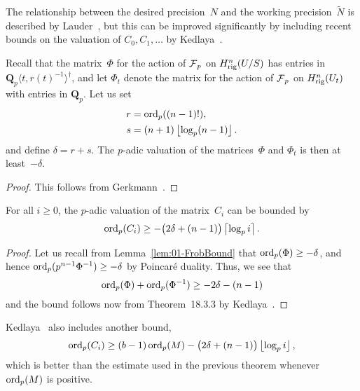 The relationship between the desired precision~$N$ and the working 
precision~$\tilde{N}$ is described by Lauder~\citep[Theorem~5.1]{Lauder2006}, 
but this can be improved significantly by including recent bounds on the 
valuation of $C_0, C_1, \dotsc$ by Kedlaya~\citep{Kedlaya2010}.

\begin{lem} \label{lem:01-FrobBound}
Recall that the matrix~$\Phi$ for the action of $\operatorname{\mathcal{F}}_p$ 
on $H_{\text{rig}}^{n}(U/S)$ has entries in 
$\mathbf{Q}_p\langle t, r(t)^{-1}\rangle^{\dagger}$, 
and let $\Phi_t$ denote the matrix for the action of $\operatorname{\mathcal{F}}_p$ 
on $H_{\text{rig}}^{n}(U_t)$ with entries in $\mathbf{Q}_p$.  Let us set 
\begin{align*}
r & = \operatorname{ord}_p((n-1)!), \\
s & = (n + 1) \left\lfloor\log_p(n-1)\right\rfloor.
\end{align*}
and define  $\delta = r + s$.  The $p$-adic valuation of the 
matrices~$\Phi$ and $\Phi_t$ is then at least~$-\delta$.
\end{lem}

\begin{proof}
This follows from Gerkmann~\citep[Lemma~3.3]{Gerkmann2007}.
\end{proof}

\begin{thm} \label{thm:valC}
For all $i \geq 0$, the $p$-adic valuation of the matrix~$C_i$ 
can be bounded by 
\begin{equation*}
\operatorname{ord}_p(C_i) \geq - \bigl(2 \delta + (n - 1)\bigr) \left\lceil\log_p i\right\rceil.
\end{equation*}
\end{thm}

\begin{proof}
Let us recall from Lemma~\ref{lem:01-FrobBound} that 
$\operatorname{ord}_p(\Phi) \geq -\delta$, and hence $\operatorname{ord}_p(p^{n-1}\Phi^{-1}) \geq -\delta$ 
by Poincar\'e duality.  Thus, we see that 
\begin{equation*}
\operatorname{ord}_p(\Phi) + \operatorname{ord}_p(\Phi^{-1}) \geq - 2 \delta - (n-1)
\end{equation*}
and the bound follows now from Theorem~{18.3.3} by 
Kedlaya~\citep{Kedlaya2010}.
\end{proof}

\begin{rem}
Kedlaya~\citep[Remark~18.3.4]{Kedlaya2010} also includes another bound,
\begin{equation*}
\operatorname{ord}_p(C_i) \geq (b - 1) \operatorname{ord}_p(M) 
            - \bigl(2 \delta + (n - 1)\bigr) \left\lfloor\log_p i\right\rfloor,
\end{equation*}
which is better than the estimate used in the previous theorem whenever 
$\operatorname{ord}_p(M)$ is positive.
\end{rem}

